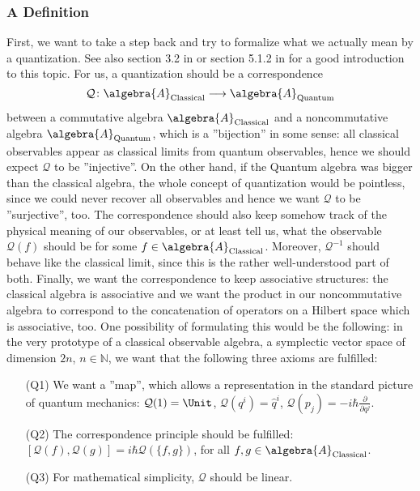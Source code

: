 \subsubsection{A Definition}
First, we want to take a step back and try to formalize what we actually mean by a 
quantization. See also section 3.2 in \cite{esposito:2015a} or section 5.1.2 in
\cite{waldmann:2007a} for a good introduction to this topic. For us, a 
quantization should be a correspondence
\begin{equation*}
	\mathcal{Q}
	\colon
	\algebra{A}_{\mathrm{Classical}}
	\longrightarrow
	\algebra{A}_{\mathrm{Quantum}}
\end{equation*}
between a commutative algebra $\algebra{A}_{\mathrm{Classical}}$ and a 
noncommutative algebra $\algebra{A}_{\mathrm{Quantum}}$, which is a 
''bijection'' in some sense: all classical observables appear as classical 
limits from quantum observables, hence we should expect $\mathcal{Q}$ to be 
''injective''. On the other hand, if the Quantum algebra was bigger than the 
classical algebra, the whole concept of quantization would be pointless, since 
we could never recover all observables and hence we want $\mathcal{Q}$ to be 
''surjective'', too. The correspondence should also keep somehow track of the 
physical meaning of our observables, or at least tell us, what the observable 
$\mathcal{Q}(f)$ should be for some $f \in \algebra{A}_{\mathrm{Classical}}$. 
Moreover, $\mathcal{Q}^{-1}$ should behave like the classical limit, since this 
is the rather well-understood part of both. Finally, we want the correspondence to
keep associative structures: the classical algebra is associative and we want 
the product in our noncommutative algebra to correspond to the concatenation of 
operators on a Hilbert space which is associative, too. One possibility of 
formulating this would be the following: in the very prototype of a classical 
observable algebra, a symplectic vector space of dimension $2n$, $n \in 
\mathbb{N}$, we want that the following three axioms are fulfilled:
\begin{enumerate}
	\item[(Q1)]
	We want a ''map'', which allows a representation in the standard 
	picture of quantum mechanics:
	$\mathcal{Q}(1) = \Unit$, 
	$\mathcal{Q}(q^i) = \hat{q}^i$, 
	$\mathcal{Q}(p_j) = - i \hbar \frac{\partial}{\partial q^j}$.
	
	\item[(Q2)]
	The correspondence principle should be fulfilled:
	$[\mathcal{Q}(f), \mathcal{Q}(g)] = i \hbar \mathcal{Q}(\{f, g\})$, 
	for all $f, g \in \algebra{A}_{\mathrm{Classical}}$.
	
	\item[(Q3)]
	For mathematical simplicity, $\mathcal{Q}$ should be linear.
\end{enumerate}
